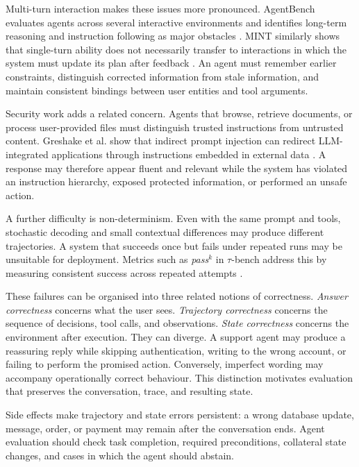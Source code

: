 Multi-turn interaction makes these issues more pronounced. AgentBench evaluates agents across several interactive environments and identifies long-term reasoning and instruction following as major obstacles \citep{liu2023agentbench}. MINT similarly shows that single-turn ability does not necessarily transfer to interactions in which the system must update its plan after feedback \citep{wang2023mint}. An agent must remember earlier constraints, distinguish corrected information from stale information, and maintain consistent bindings between user entities and tool arguments.

Security work adds a related concern. Agents that browse, retrieve documents, or process user-provided files must distinguish trusted instructions from untrusted content. Greshake et al. show that indirect prompt injection can redirect LLM-integrated applications through instructions embedded in external data \citep{greshake2023not}. A response may therefore appear fluent and relevant while the system has violated an instruction hierarchy, exposed protected information, or performed an unsafe action.

A further difficulty is non-determinism. Even with the same prompt and tools, stochastic decoding and small contextual differences may produce different trajectories. A system that succeeds once but fails under repeated runs may be unsuitable for deployment. Metrics such as \textit{pass}$^k$ in $\tau$-bench address this by measuring consistent success across repeated attempts \citep{yao2024taubench}.

These failures can be organised into three related notions of correctness. \emph{Answer correctness} concerns what the user sees. \emph{Trajectory correctness} concerns the sequence of decisions, tool calls, and observations. \emph{State correctness} concerns the environment after execution. They can diverge. A support agent may produce a reassuring reply while skipping authentication, writing to the wrong account, or failing to perform the promised action. Conversely, imperfect wording may accompany operationally correct behaviour. This distinction motivates evaluation that preserves the conversation, trace, and resulting state.

Side effects make trajectory and state errors persistent: a wrong database update, message, order, or payment may remain after the conversation ends. Agent evaluation should check task completion, required preconditions, collateral state changes, and cases in which the agent should abstain.

